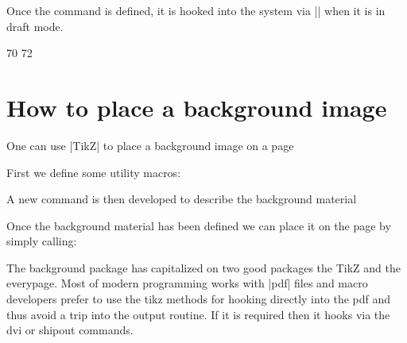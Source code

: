 Once the command is defined, it is hooked into the system via |\EveryShipout| when it is in draft mode. 

\begin{teX}
70  \EveryShipout{\@Prelim@EveryShipout}
72 \fi
\end{teX}

\section{How to place a background image}

One can use |TikZ| to place a background image on a page

First we define some utility macros:


\begin{teXXX}
  \def\bg@contents{Draft}
  \def\bg@color{red!45}
  \def\bg@angle{60}
  \def\bg@opacity{.5}
  \def\bg@scale{15}
  \def\bg@position{current page.center}
  \def\bg@anchor{}
  \def\bg@hshift{0}
  \def\bg@vshift{0}
\end{teXXX}

A new command is then developed to describe the background material

\begin{scriptexample}{}{}
\begin{teX}
\newcommand\bg@material{%
   \begin{tikzpicture}[remember picture,overlay]
   \node [rotate=\bg@angle,scale=\bg@scale,opacity=\bg@opacity,%
   xshift=\bg@hshift,yshift=\bg@vshift,color=\bg@color]
   at (\bg@position) [\bg@anchor] {\bg@contents};
  \end{tikzpicture}}%
\end{teX}
\end{scriptexample}

Once the background material has been defined we can place it on the page by simply calling:

\begin{scriptexample}{}{}
\begin{teX}
   \newcommand\BgThispage{\AddThispageHook{\bg@material}}
\end{teX}
\end{scriptexample}

The background package has capitalized on two good packages the TikZ and the everypage. Most of modern
\tex programming works with |pdf| files and macro developers prefer to use the tikz methods for hooking directly into the pdf and thus avoid a trip into the output routine. If it is required then it hooks via the dvi or shipout commands.







 






































